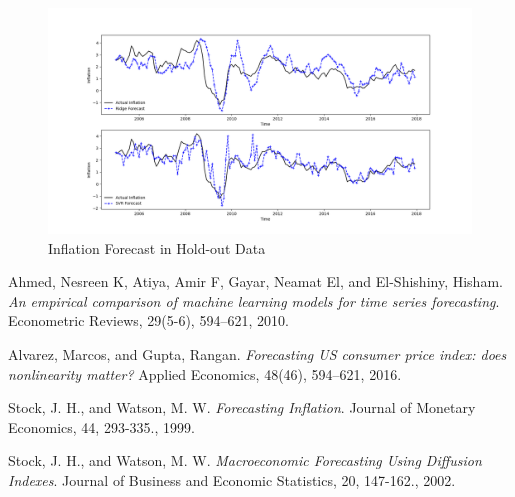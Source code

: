 \documentclass[10pt,twocolumn,letterpaper]{article}
\begin{document}
\begin{figure}
\begin{center}
\includegraphics[scale=0.48]{../../Python/Forecast_HO.png}
\caption{Inflation Forecast in Hold-out Data}
\end{center}
\end{figure}



\begin{thebibliography}{9}
Ahmed, Nesreen K, Atiya, Amir F, Gayar, Neamat El, and El-Shishiny, Hisham.
\textit{An empirical comparison of machine learning models for time series forecasting}. 
 Econometric Reviews, 29(5-6), 594–621, 2010. 

Alvarez, Marcos, and Gupta, Rangan.
\textit{Forecasting US consumer price index: does nonlinearity matter?}
Applied Economics, 48(46), 594–621, 2016. 

Stock, J. H., and Watson, M. W.
\textit{Forecasting Inflation}. 
Journal of Monetary Economics, 44, 293-335., 1999. 
 
Stock, J. H., and Watson, M. W.
\textit{Macroeconomic Forecasting Using Diffusion Indexes}. 
Journal of Business and Economic Statistics, 20, 147-162., 2002. 
 
\end{thebibliography}
\end{document}
